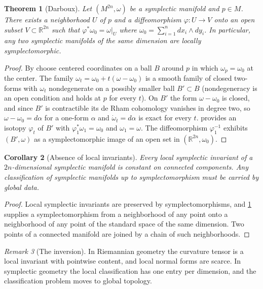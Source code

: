 \documentclass[11pt,letterpaper]{article}
\newtheorem{theorem}{Theorem}[section]
\newtheorem{corollary}[theorem]{Corollary}
\theoremstyle{definition}
\theoremstyle{remark}
\newtheorem{remark}[theorem]{Remark}
\begin{document}
\begin{theorem}[Darboux]
\label{thm:darboux}
Let $(M^{2n}, \omega)$ be a symplectic manifold and $p \in M$. There exists a neighborhood $U$ of $p$ and a diffeomorphism $\varphi : U \to V$ onto an open subset $V \subset \mathbb{R}^{2n}$ such that $\varphi^{*} \omega_0 = \omega|_U$ where $\omega_0 = \sum_{i=1}^{n} dx_i \wedge dy_i$. In particular, any two symplectic manifolds of the same dimension are locally symplectomorphic.
\end{theorem}

\begin{proof}
By  choose centered coordinates on a ball $B$ around $p$ in which $\omega_p = \omega_0$ at the center. The family $\omega_t = \omega_0 + t(\omega - \omega_0)$ is a smooth family of closed two-forms with $\omega_t$ nondegenerate on a possibly smaller ball $B' \subset B$ (nondegeneracy is an open condition and holds at $p$ for every $t$). On $B'$ the form $\omega - \omega_0$ is closed, and since $B'$ is contractible its de Rham cohomology vanishes in degree two, so $\omega - \omega_0 = d\alpha$ for a one-form $\alpha$ and $\dot{\omega}_t = d\alpha$ is exact for every $t$.  provides an isotopy $\varphi_t$ of $B'$ with $\varphi_1^{*} \omega_1 = \omega_0$ and $\omega_1 = \omega$. The diffeomorphism $\varphi_1^{-1}$ exhibits $(B', \omega)$ as a symplectomorphic image of an open set in $(\mathbb{R}^{2n}, \omega_0)$.
\end{proof}

\begin{corollary}[Absence of local invariants]
\label{cor:no-local}
Every local symplectic invariant of a $2n$-dimensional symplectic manifold is constant on connected components. Any classification of symplectic manifolds up to symplectomorphism must be carried by global data.
\end{corollary}

\begin{proof}
Local symplectic invariants are preserved by symplectomorphisms, and \cref{thm:darboux} supplies a symplectomorphism from a neighborhood of any point onto a neighborhood of any point of the standard space of the same dimension. Two points of a connected manifold are joined by a chain of such neighborhoods.
\end{proof}

\begin{remark}[The inversion]
\label{rem:inversion}
In Riemannian geometry the curvature tensor is a local invariant with pointwise content, and local normal forms are scarce. In symplectic geometry the local classification has one entry per dimension, and the classification problem moves to global topology.
\end{remark}
\end{document}
